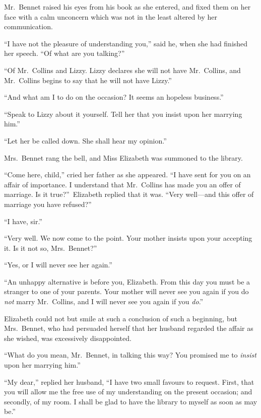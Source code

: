 \documentclass[12pt,english,oneside]{book}
\begin{document}
Mr.\ Bennet raised his eyes from his book as she entered, and fixed
them on her face with a calm unconcern which was not in the least
altered by her communication.

{}``I have not the pleasure of understanding you,'' said he, when
she had finished her speech. {}``Of what are you talking?''\ 

{}``Of Mr.\ Collins and Lizzy. Lizzy declares she will not have
Mr.\ Collins, and Mr.\ Collins begins to say that he will not have
Lizzy.''

{}``And what am I to do on the occasion? It seems an hopeless business.''

{}``Speak to Lizzy about it yourself. Tell her that you insist upon
her marrying him.''

{}``Let her be called down. She shall hear my opinion.''

Mrs.\ Bennet rang the bell, and Miss Elizabeth was summoned to the
library.

{}``Come here, child,'' cried her father as she appeared. {}``I
have sent for you on an affair of importance. I understand that Mr.\ 
Collins has made you an offer of marriage. Is it true?''\ Elizabeth
replied that it was. {}``Very well\mbox{---}and this offer of marriage
you have refused?''\ 

{}``I have, sir.''

{}``Very well. We now come to the point. Your mother insists upon
your accepting it. Is it not so, Mrs.\ Bennet?''\ 

{}``Yes, or I will never see her again.''

{}``An unhappy alternative is before you, Elizabeth. From this day
you must be a stranger to one of your parents. Your mother will never
see you again if you do \textit{not} marry Mr.\ Collins, and I will
never see you again if you \textit{do}.''

Elizabeth could not but smile at such a conclusion of such a beginning,
but Mrs.\ Bennet, who had persuaded herself that her husband regarded
the affair as she wished, was excessively disappointed.

{}``What do you mean, Mr.\ Bennet, in talking this way? You promised
me to \textit{insist} upon her marrying him.''

{}``My dear,'' replied her husband, {}``I have two small favours
to request. First, that you will allow me the free use of my understanding
on the present occasion; and secondly, of my room. I shall be glad
to have the library to myself as soon as may be.''
\end{document}
